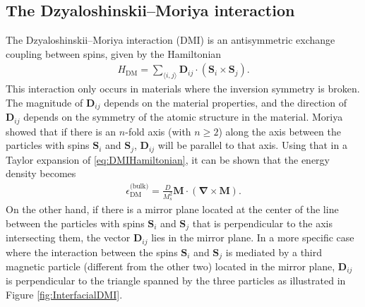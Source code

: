 \subsection{The Dzyaloshinskii--Moriya interaction}
The Dzyaloshinskii--Moriya interaction (DMI) is an antisymmetric exchange coupling between spins, given by the Hamiltonian
\begin{align}
H_{\text{DM}} = \sum_{\langle i,j\rangle}\mathbold{D}_{ij}\cdot(\mathbold{S}_i\times\mathbold{S}_j). \label{eq:DMIHamiltonian}
\end{align}
This interaction only occurs in materials where the inversion symmetry is broken. The magnitude of $\mathbold{D}_{ij}$ depends on the material properties, and the direction of $\mathbold{D}_{ij}$ depends on the symmetry of the atomic structure in the material. Moriya showed \cite{Moriya1960} that if there is an $n$-fold axis (with $n \geq 2$) along the axis between the particles with spins $\mathbold{S}_i$ and $\mathbold{S}_j$, $\mathbold{D}_{ij}$ will be parallel to that axis. Using that in a Taylor expansion of \eqref{eq:DMIHamiltonian}, it can be shown \cite{Project} that the energy density becomes
\begin{align}
\label{eq:DMBulk}
\epsilon_{\text{DM}}^{\textrm{(bulk)}} = \frac{D}{M_s^2}\mathbold{M}\cdot(\mathbold{\nabla}\times\mathbold{M}).
\end{align}
On the other hand, if there is a mirror plane located at the center of the line between the particles with spins $\mathbold{S}_i$ and $\mathbold{S}_j$ that is perpendicular to the axis intersecting them, the vector $\mathbold{D}_{ij}$ lies in the mirror plane. In a more specific case where the interaction between the spins $\mathbold{S}_i$ and $\mathbold{S}_j$ is mediated by a third magnetic particle (different from the other two) located in the mirror plane, $\mathbold{D}_{ij}$ is perpendicular to the triangle spanned by the three particles as illustrated in Figure \ref{fig:InterfacialDMI}. 
